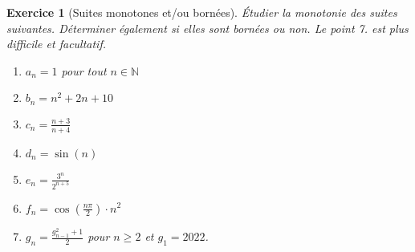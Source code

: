 \documentclass[11.5pt,french,table]{article}
\theoremstyle{exercice}
\newtheorem{exercice}{Exercice}
\begin{document}
\begin{exercice}[Suites monotones et/ou bornées]
Étudier la monotonie des suites suivantes. Déterminer également si elles sont bornées ou non. Le point 7. est plus difficile et facultatif.

\begin{enumerate}
    \item $\displaystyle a_n = 1$ pour tout $n \in \mathbb N$
    \item $\displaystyle b_n = n^2 + 2n + 10$
    \item $\displaystyle c_n = \frac{n+3}{n+4}$
    \item $\displaystyle d_n = \sin(n)$
    \item $\displaystyle e_n = \frac{3^n}{2^{n+5}}$
    \item $\displaystyle f_n =  \cos \left( \frac{n \pi}{2} \right) \cdot n^2$
    \item[7.*] $\displaystyle g_n =  \frac{g_{n-1}^2 + 1}{2}$ pour $n \geq 2$ et $g_1 = 2022$.
\end{enumerate}
\end{exercice}
\end{document}
